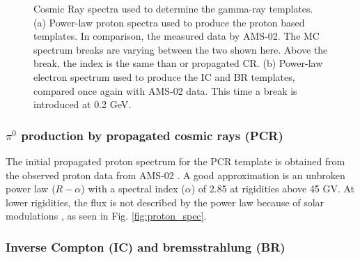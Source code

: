 \begin{figure}[h]
\begin{minipage}[h]{0.45\textwidth}
	  \subcaption{}
	  \label{fig:electron_spec}
  \end{minipage}
  \caption{Cosmic Ray spectra used to determine the gamma-ray templates. (a) Power-law proton spectra used to produce the proton based templates. In comparison, the measured data by AMS-02. The MC spectrum breaks are varying between the two shown here. Above the break, the index is the same than or propagated CR. (b) Power-law electron spectrum used to produce the IC and BR templates, compared once again with AMS-02 data. This time a break is introduced at 0.2 GeV.}
  \label{fig:cosmic_ray_spec}
\end{figure}


\subsubsection{$\pi^0$ production by propagated cosmic rays (PCR)}

The initial propagated proton spectrum for the PCR template is obtained from the observed proton data from AMS-02 \cite{Aguilar15}. A good approximation is an unbroken power law ($R-\alpha$) with a spectral index ($\alpha$) of 2.85 at rigidities above 45 GV. At lower rigidities, the flux is not described by the power law because of solar modulations \cite{Gleeson68}, as seen in Fig. \ref{fig:proton_spec}. %



\subsubsection{Inverse Compton (IC) and bremsstrahlung (BR)}

